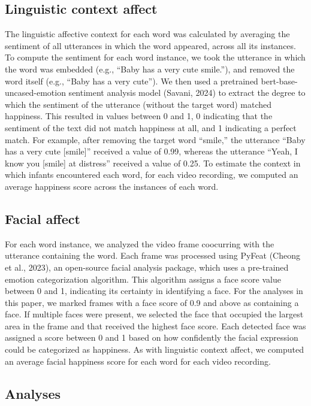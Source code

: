\documentclass[10pt, letterpaper]{article}
\begin{document}
\subsection{Linguistic context affect}\label{linguistic-context-affect}

The linguistic affective context for each word was calculated by
averaging the sentiment of all utterances in which the word appeared,
across all its instances. To compute the sentiment for each word
instance, we took the utterance in which the word was embedded (e.g.,
``Baby has a very cute smile.''), and removed the word itself (e.g.,
``Baby has a very cute''). We then used a pretrained
bert-base-uncased-emotion sentiment analysis model (Savani, 2024) to
extract the degree to which the sentiment of the utterance (without the
target word) matched happiness. This resulted in values between 0 and 1,
0 indicating that the sentiment of the text did not match happiness at
all, and 1 indicating a perfect match. For example, after removing the
target word ``smile,'' the utterance ``Baby has a very cute
{[}smile{]}'' received a value of 0.99, whereas the utterance ``Yeah, I
know you {[}smile{]} at distress'' received a value of 0.25. To estimate
the context in which infants encountered each word, for each video
recording, we computed an average happiness score across the instances
of each word.

\subsection{Facial affect}\label{facial-affect}

For each word instance, we analyzed the video frame coocurring with the
utterance containing the word. Each frame was processed using PyFeat
(Cheong et al., 2023), an open-source facial analysis package, which
uses a pre-trained emotion categorization algorithm. This algorithm
assigns a face score value between 0 and 1, indicating its certainty in
identifying a face. For the analyses in this paper, we marked frames
with a face score of 0.9 and above as containing a face. If multiple
faces were present, we selected the face that occupied the largest area
in the frame and that received the highest face score. Each detected
face was assigned a score between 0 and 1 based on how confidently the
facial expression could be categorized as happiness. As with linguistic
context affect, we computed an average facial happiness score for each
word for each video recording.

\subsection{Analyses}\label{analyses}
\end{document}
